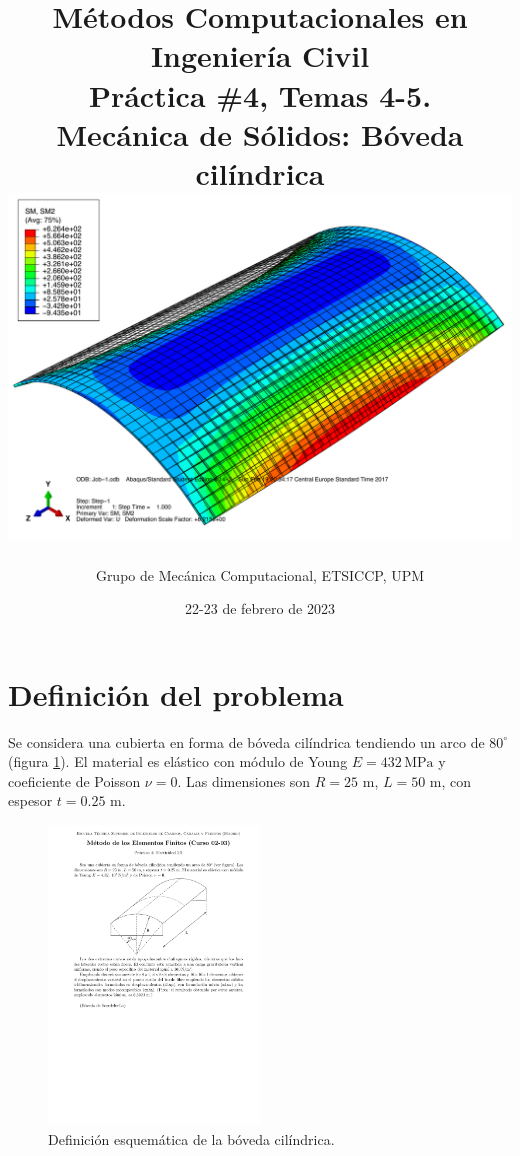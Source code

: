 \documentclass[spanish,a4paper,12pt]{article}
\title{\vspace*{-4ex}
	\bf\normalsize
	Métodos Computacionales en Ingeniería Civil\\
	\Large
	Práctica \#4, Temas 4-5.\\
	Mecánica de Sólidos: Bóveda cilíndrica\\[3ex]
	\includegraphics[scale=0.50]{figs/boveda2017-5}
	}
\author{%
        {\small\sc 
	Grupo de Mecánica Computacional, ETSICCP, UPM}}
\date{22-23 de febrero de 2023}
\begin{document}
\pagestyle{fancy}
\lhead[\fancyplain{}{\thepage}]{\fancyplain{}{\rightmark}}
\rhead[\fancyplain{}{\leftmark}]{\fancyplain{}{\thepage}}
\cfoot[\fancyplain{\thepage}{}]{\fancyplain{\thepage}{}}

\renewcommand{\sectionmark}[1]{\markright{\sf Aptdo.\ \thesection. #1}{}}


\maketitle

\tableofcontents


\section{Definición del problema}
\label{sec:problema}
Se considera una cubierta en forma de bóveda cilíndrica tendiendo un arco de $80^{\circ}$ (figura \ref{fig:esquema}). El material es elástico con módulo de Young $E=432\,\text{MPa}$ y coeficiente de Poisson $\nu=0$.
Las dimensiones son $R=25$ m, $L=50$ m, con espesor $t=0.25$ m.
\begin{figure}[!ht]
\centering
\includegraphics[width=0.5\textwidth]{figs/boveda_scordelis-lo}
\caption{Definición esquemática de la bóveda cilíndrica. }
\label{fig:esquema}
\end{figure}
\end{document}
